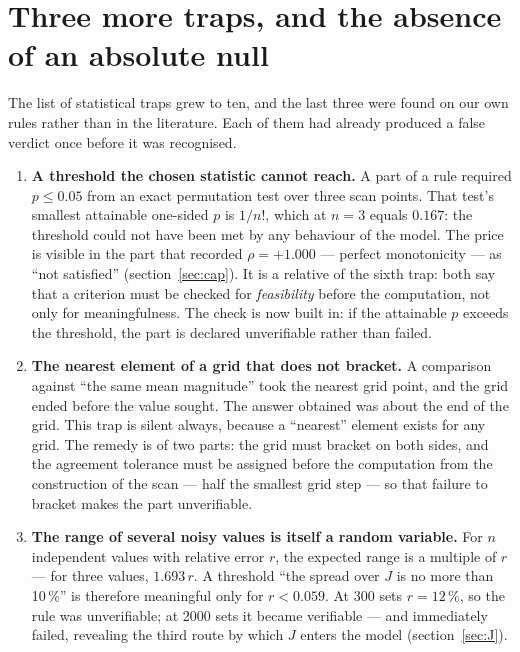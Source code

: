 \section{Three more traps, and the absence of an absolute null}\label{sec:null}
The list of statistical traps grew to ten, and the last three were found on our own rules rather than in the literature. Each of them had already produced a false verdict once before it was recognised.

\begin{enumerate}[start=8,leftmargin=1.9em,itemsep=3pt]
\item \textbf{A threshold the chosen statistic cannot reach.} A part of a rule required $p\le0.05$ from an exact permutation test over three scan points. That test's smallest attainable one-sided $p$ is $1/n!$, which at $n=3$ equals $0.167$: the threshold could not have been met by any behaviour of the model. The price is visible in the part that recorded $\rho=+1.000$ --- perfect monotonicity --- as ``not satisfied'' (section~\ref{sec:cap}). It is a relative of the sixth trap: both say that a criterion must be checked for \emph{feasibility} before the computation, not only for meaningfulness. The check is now built in: if the attainable $p$ exceeds the threshold, the part is declared unverifiable rather than failed.
\item \textbf{The nearest element of a grid that does not bracket.} A comparison against ``the same mean magnitude'' took the nearest grid point, and the grid ended before the value sought. The answer obtained was about the end of the grid. This trap is silent always, because a ``nearest'' element exists for any grid. The remedy is of two parts: the grid must bracket on both sides, and the agreement tolerance must be assigned before the computation from the construction of the scan --- half the smallest grid step --- so that failure to bracket makes the part unverifiable.
\item \textbf{The range of several noisy values is itself a random variable.} For $n$ independent values with relative error $r$, the expected range is a multiple of $r$ --- for three values, $1.693\,r$. A threshold ``the spread over $J$ is no more than 10\,\%'' is therefore meaningful only for $r<0.059$. At 300 sets $r=12\,\%$, so the rule was unverifiable; at 2000 sets it became verifiable --- and immediately failed, revealing the third route by which $J$ enters the model (section~\ref{sec:J}).
\end{enumerate}

